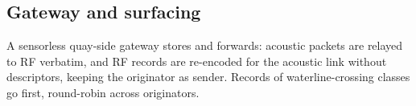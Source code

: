 \subsection{Gateway and surfacing}
A sensorless quay-side gateway stores and forwards: acoustic packets are relayed to RF verbatim,
and RF records are re-encoded for the acoustic link without descriptors, keeping the originator
as sender. Records of waterline-crossing classes go first, round-robin across originators.
